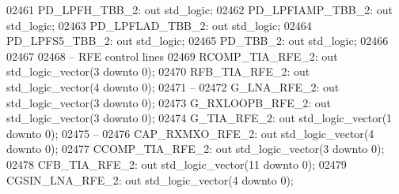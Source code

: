\begin{DoxyCode}
02461     PD\_LPFH\_TBB\_2:  \textcolor{keywordflow}{out} \textcolor{comment}{std\_logic};
02462     PD\_LPFIAMP\_TBB\_2:   \textcolor{keywordflow}{out} \textcolor{comment}{std\_logic};
02463     PD\_LPFLAD\_TBB\_2:    \textcolor{keywordflow}{out} \textcolor{comment}{std\_logic};
02464     PD\_LPFS5\_TBB\_2: \textcolor{keywordflow}{out} \textcolor{comment}{std\_logic};
02465     PD\_TBB\_2:   \textcolor{keywordflow}{out} \textcolor{comment}{std\_logic};
02466 
02467 
02468 \textcolor{keyword}{    -- RFE control lines}
02469     RCOMP\_TIA\_RFE\_2:    \textcolor{keywordflow}{out} \textcolor{comment}{std\_logic\_vector}(\textcolor{vhdllogic}{}\textcolor{vhdllogic}{3} \textcolor{keywordflow}{downto} \textcolor{vhdllogic}{}\textcolor{vhdllogic}{0});
02470     RFB\_TIA\_RFE\_2:  \textcolor{keywordflow}{out} \textcolor{comment}{std\_logic\_vector}(\textcolor{vhdllogic}{}\textcolor{vhdllogic}{4} \textcolor{keywordflow}{downto} \textcolor{vhdllogic}{}\textcolor{vhdllogic}{0});
02471 \textcolor{keyword}{    --}
02472     G\_LNA\_RFE\_2:    \textcolor{keywordflow}{out} \textcolor{comment}{std\_logic\_vector}(\textcolor{vhdllogic}{}\textcolor{vhdllogic}{3} \textcolor{keywordflow}{downto} \textcolor{vhdllogic}{}\textcolor{vhdllogic}{0});
02473     G\_RXLOOPB\_RFE\_2:    \textcolor{keywordflow}{out} \textcolor{comment}{std\_logic\_vector}(\textcolor{vhdllogic}{}\textcolor{vhdllogic}{3} \textcolor{keywordflow}{downto} \textcolor{vhdllogic}{}\textcolor{vhdllogic}{0});
02474     G\_TIA\_RFE\_2:    \textcolor{keywordflow}{out} \textcolor{comment}{std\_logic\_vector}(\textcolor{vhdllogic}{}\textcolor{vhdllogic}{1} \textcolor{keywordflow}{downto} \textcolor{vhdllogic}{}\textcolor{vhdllogic}{0});
02475 \textcolor{keyword}{    --}
02476     CAP\_RXMXO\_RFE\_2:    \textcolor{keywordflow}{out} \textcolor{comment}{std\_logic\_vector}(\textcolor{vhdllogic}{}\textcolor{vhdllogic}{4} \textcolor{keywordflow}{downto} \textcolor{vhdllogic}{}\textcolor{vhdllogic}{0});
02477     CCOMP\_TIA\_RFE\_2:    \textcolor{keywordflow}{out} \textcolor{comment}{std\_logic\_vector}(\textcolor{vhdllogic}{}\textcolor{vhdllogic}{3} \textcolor{keywordflow}{downto} \textcolor{vhdllogic}{}\textcolor{vhdllogic}{0});
02478     CFB\_TIA\_RFE\_2:  \textcolor{keywordflow}{out} \textcolor{comment}{std\_logic\_vector}(\textcolor{vhdllogic}{}\textcolor{vhdllogic}{11} \textcolor{keywordflow}{downto} \textcolor{vhdllogic}{}\textcolor{vhdllogic}{0});
02479     CGSIN\_LNA\_RFE\_2:    \textcolor{keywordflow}{out} \textcolor{comment}{std\_logic\_vector}(\textcolor{vhdllogic}{}\textcolor{vhdllogic}{4} \textcolor{keywordflow}{downto} \textcolor{vhdllogic}{}\textcolor{vhdllogic}{0});

\end{DoxyCode}
